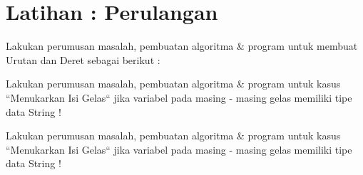 \chapter{Latihan : Perulangan}

\begin{pemrograman}
Lakukan perumusan masalah, pembuatan algoritma \& program untuk membuat Urutan dan Deret sebagai berikut : 
\end{pemrograman}

\begin{pemrograman}
Lakukan perumusan masalah, pembuatan algoritma \& program untuk kasus ``Menukarkan Isi Gelas`` jika variabel pada masing - masing gelas memiliki tipe data String !
\end{pemrograman}

\begin{pemrograman}
Lakukan perumusan masalah, pembuatan algoritma \& program untuk kasus ``Menukarkan Isi Gelas`` jika variabel pada masing - masing gelas memiliki tipe data String !
\end{pemrograman}




	
 
